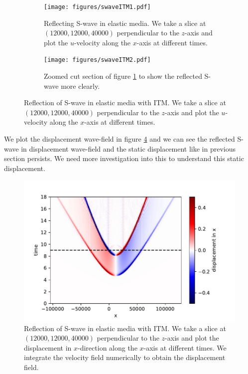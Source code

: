 \begin{figure}[htpb]
    \begin{subfigure}[t]{0.49\textwidth}   
        \centering 
        \texttt{[image: figures/swaveITM1.pdf]}
        \caption{Reflecting S-wave in elastic media. We take a slice at $\left(12000,12000,40000\right)$ perpendicular to the $z$-axis
        and plot the $u$-velocity along the $x$-axis at different times.}
        \label{subfig:swave}
    \end{subfigure}
    \hfill
    \begin{subfigure}[t]{0.49\textwidth}   
        \centering 
        \texttt{[image: figures/swaveITM2.pdf]}
        \caption{Zoomed cut section of figure \ref{subfig:swave} to show the reflected S-wave more clearly.}
        \label{subfig:swavezoomed}
    \end{subfigure}
    \caption{Reflection of S-wave in elastic media with \ac{ITM}. We take a slice at $\left(12000,12000,40000\right)$ perpendicular to the $z$-axis and plot the $u$-velocity along the $x$-axis at different times.}
    \label{fig:space-timeplot-swave}
\end{figure}
    
We plot the displacement wave-field in figure \ref{fig:space-timeplot-swavedisplacement} and we can see the reflected S-wave in displacement 
wave-field and the static displacement like in previous section persists. We need more investigation into this to understand this static displacement.

\begin{figure}[htpb]
    \centering
    \includegraphics[width=0.85\linewidth]{figures/swaveITMdisplacement.pdf}
    \caption{Reflection of S-wave in elastic media with \ac{ITM}. We take a slice at $\left(12000,12000,40000\right)$ perpendicular to the $z$-axis
    and plot the displacement in $x$-direction along the $x$-axis at different times. We integrate the velocity field numerically to obtain the displacement field.}
    \label{fig:space-timeplot-swavedisplacement}
\end{figure}

